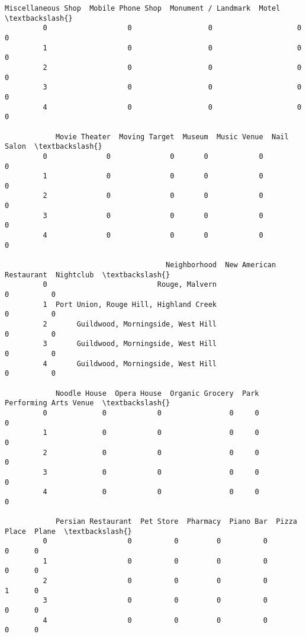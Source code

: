 \documentclass[11pt]{article}
\begin{document}
\begin{Verbatim}[commandchars=\\\{\}]
            Miscellaneous Shop  Mobile Phone Shop  Monument / Landmark  Motel  \textbackslash{}
         0                   0                  0                    0      0   
         1                   0                  0                    0      0   
         2                   0                  0                    0      0   
         3                   0                  0                    0      0   
         4                   0                  0                    0      0   
         
            Movie Theater  Moving Target  Museum  Music Venue  Nail Salon  \textbackslash{}
         0              0              0       0            0           0   
         1              0              0       0            0           0   
         2              0              0       0            0           0   
         3              0              0       0            0           0   
         4              0              0       0            0           0   
         
                                      Neighborhood  New American Restaurant  Nightclub  \textbackslash{}
         0                          Rouge, Malvern                        0          0   
         1  Port Union, Rouge Hill, Highland Creek                        0          0   
         2       Guildwood, Morningside, West Hill                        0          0   
         3       Guildwood, Morningside, West Hill                        0          0   
         4       Guildwood, Morningside, West Hill                        0          0   
         
            Noodle House  Opera House  Organic Grocery  Park  Performing Arts Venue  \textbackslash{}
         0             0            0                0     0                      0   
         1             0            0                0     0                      0   
         2             0            0                0     0                      0   
         3             0            0                0     0                      0   
         4             0            0                0     0                      0   
         
            Persian Restaurant  Pet Store  Pharmacy  Piano Bar  Pizza Place  Plane  \textbackslash{}
         0                   0          0         0          0            0      0   
         1                   0          0         0          0            0      0   
         2                   0          0         0          0            1      0   
         3                   0          0         0          0            0      0   
         4                   0          0         0          0            0      0   
         

\end{Verbatim}
\end{document}
